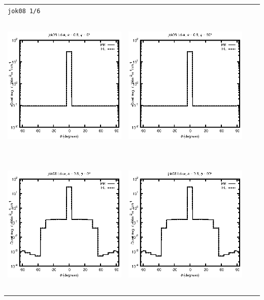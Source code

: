 \documentclass[10pt,a4paper]{article}
\begin{document}
\begin{adjustwidth}{-1.2in}{-1.2in}
\begin{tabular}{c c c c}
\multicolumn{4}{l}{\texttt{jok08 1/6}} \\
\includegraphics[height=7cm]{../eps/jok08_Ld_a_fwd.eps} &
\includegraphics[height=7cm]{../eps/jok08_Ld_a_cross.eps}\\
\includegraphics[height=7cm]{../eps/jok08_Ld_w_fwd.eps} &
\includegraphics[height=7cm]{../eps/jok08_Ld_w_cross.eps} \\

\end{tabular}
\end{adjustwidth}
\end{document}
